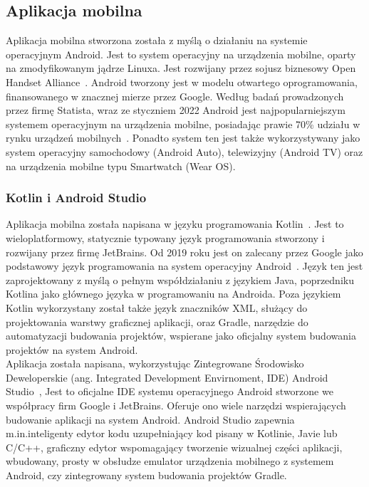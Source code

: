 \newpage            
	\subsection{Aplikacja mobilna}
	Aplikacja mobilna stworzona została z myślą o działaniu na systemie operacyjnym Android. Jest to system operacyjny na urządzenia mobilne, oparty na zmodyfikowanym jądrze Linuxa.
	Jest rozwijany przez sojusz biznesowy Open Handset Alliance~\cite{OHA}. Android tworzony jest w modelu otwartego oprogramowania, finansowanego w znacznej mierze przez Google.
	Według badań prowadzonych przez firmę Statista, wraz ze styczniem 2022 Android jest najpopularniejszym systemem operacyjnym na urządzenia mobilne, posiadając prawie 70\% 
	udziału w rynku urządzeń mobilnych~\cite{OS_SHARE}. Ponadto system ten jest także wykorzystywany jako system operacyjny samochodowy (Android Auto), telewizyjny (Android TV) oraz
	na urządzenia mobilne typu Smartwatch (Wear OS). \\

		\subsubsection{Kotlin i Android Studio}
		Aplikacja mobilna została napisana w języku programowania Kotlin~\cite{KT_MAIN}. Jest to wieloplatformowy, statycznie typowany język programowania stworzony i rozwijany przez firmę JetBrains.
		Od 2019 roku jest on zalecany przez Google jako podstawowy język programowania na system operacyjny Android~\cite{ANDROID_KT}. Język ten jest zaprojektowany z myślą o
		pełnym współdziałaniu z językiem Java, poprzedniku Kotlina jako głównego języka w programowaniu na Androida. Poza językiem Kotlin wykorzystany został także język znaczników XML, służący do projektowania warstwy graficznej aplikacji, oraz Gradle, narzędzie do automatyzacji budowania projektów, 
		wspierane jako oficjalny system budowania projektów na system Android. \\

		Aplikacja została napisana, wykorzystując Zintegrowane Środowisko Deweloperskie (ang. Integrated Development Envirnoment, IDE) Android Studio~\cite{MEET_AS}, Jest to oficjalne IDE systemu operacyjnego
		Android stworzone we współpracy firm Google i JetBrains. Oferuje ono wiele narzędzi wspierających budowanie aplikacji na system Android. Android Studio zapewnia m.in.\@ inteligenty edytor kodu
		uzupełniający kod pisany w Kotlinie, Javie lub C/C++, graficzny edytor wspomagający tworzenie wizualnej części aplikacji, wbudowany, prosty w obsłudze emulator urządzenia mobilnego z 
		systemem Android, czy zintegrowany system budowania projektów Gradle. \\

